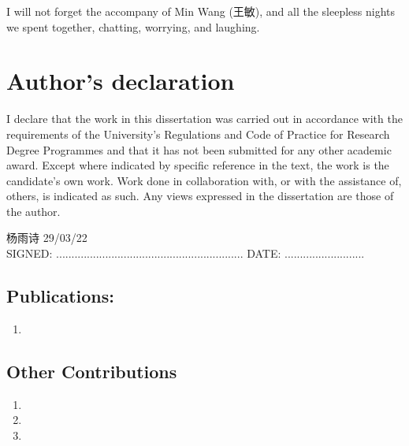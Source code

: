 \documentclass[11pt,twoside]{report}
\begin{document}

I will not forget the accompany of Min Wang (王敏), and all the sleepless nights we spent together, chatting, worrying, and laughing.

\vfill


\cleardoublepage
\chapter*{Author's declaration}

I declare that the work in this dissertation was carried out in accordance with the requirements of the University's Regulations and Code of Practice for Research Degree Programmes and that it has not been submitted for any other academic award.
Except where indicated by specific reference in the text, the work is the candidate's own work.
Work done in collaboration with, or with the assistance of, others, is indicated as such. Any views expressed in the dissertation are those of the author.

\vspace{1cm}
\vspace{-3pt}

\hspace{2.5cm} {{\selectfont \Huge{杨雨诗}}} \hspace{5.5cm} 29/03/22 \vspace{-\baselineskip} \vspace{3pt} \\
SIGNED: .............................................................
\qquad
DATE: ..........................

\vspace{1cm}

\section*{Publications:}

\begin{enumerate}
	\item {}
\end{enumerate}

\section*{Other Contributions}

\begin{enumerate}
	\item {}
	\item {}
	\item {}
\end{enumerate}
\end{document}
